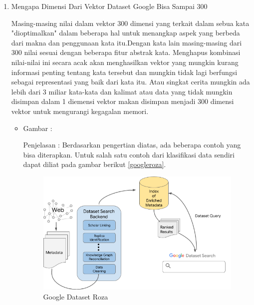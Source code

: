 \begin{enumerate}
\item Mengapa Dimensi Dari Vektor Dataset Google Bisa Sampai 300
\par Masing-masing nilai dalam vektor 300 dimensi yang terkait dalam sebua kata "dioptimalkan" dalam  beberapa hal untuk menangkap aspek yang  berbeda dari makna dan penggunaan kata itu.Dengan kata lain masing-masing dari 300 nilai sesuai dengan beberapa fitur abstrak kata. Menghapus kombinasi nilai-nilai ini secara acak akan menghasilkan vektor yang mungkin kurang informasi penting tentang kata tersebut dan mungkin tidak lagi berfungsi sebagai representasi yang baik dari kata itu. Atau singkat cerita mungkin ada lebih dari 3 miliar kata-kata dan kalimat atau data yang tidak mungkin disimpan dalam 1 diemensi vektor makan disimpan menjadi 300 dimensi vektor untuk mengurangi kegagalan memori.
\par
\begin{itemize}
\item Gambar :
\par Penjelasan : Berdasarkan pengertian diatas, ada beberapa contoh yang bisa diterapkan. Untuk salah satu contoh dari klasifikasi data sendiri dapat diliat pada gambar berikut \ref{googleroza}.
\begin{figure}[!hbtp]
\centering
\includegraphics[scale=0.16]{figures/googleroza.png}
\caption{Google Dataset Roza}
\label{text-fadila}
\end{figure}
\end{itemize}


\end{enumerate}
